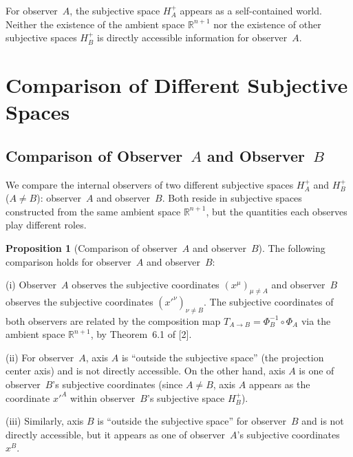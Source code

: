 \documentclass[a4paper,11pt]{article}
\theoremstyle{definition}
\newtheorem{proposition}[theorem]{Proposition}
\begin{document}
For observer~\(A\), the subjective space \(H_A^+\) appears as a self-contained world. Neither the existence of the ambient space \(\mathbb{R}^{n+1}\) nor the existence of other subjective spaces \(H_B^+\) is directly accessible information for observer~\(A\).

\section{Comparison of Different Subjective Spaces}

\subsection{Comparison of Observer~\(A\) and Observer~\(B\)}

We compare the internal observers of two different subjective spaces \(H_A^+\) and \(H_B^+\) (\(A \neq B\)): observer~\(A\) and observer~\(B\). Both reside in subjective spaces constructed from the same ambient space \(\mathbb{R}^{n+1}\), but the quantities each observes play different roles.

\begin{proposition}[Comparison of observer~\(A\) and observer~\(B\)]
The following comparison holds for observer~\(A\) and observer~\(B\):

\textup{(i)} Observer~\(A\) observes the subjective coordinates \((x^\mu)_{\mu \neq A}\) and observer~\(B\) observes the subjective coordinates \((x'^\nu)_{\nu \neq B}\). The subjective coordinates of both observers are related by the composition map \(T_{A \to B} = \Phi_B^{-1} \circ \Phi_A\) via the ambient space \(\mathbb{R}^{n+1}\), by Theorem~6.1 of {[2]}.

\textup{(ii)} For observer~\(A\), axis \(A\) is ``outside the subjective space'' (the projection center axis) and is not directly accessible. On the other hand, axis \(A\) is one of observer~\(B\)'s subjective coordinates (since \(A \neq B\), axis \(A\) appears as the coordinate \(x'^A\) within observer~\(B\)'s subjective space \(H_B^+\)).

\textup{(iii)} Similarly, axis \(B\) is ``outside the subjective space'' for observer~\(B\) and is not directly accessible, but it appears as one of observer~\(A\)'s subjective coordinates \(x^B\).
\end{proposition}
\end{document}
